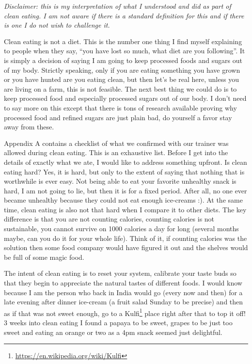 \documentclass[
  oneside]{book}
\DeclareRobustCommand{\href}[2]{#2\footnote{\url{#1}}}
\begin{document}
\emph{Disclaimer: this is my interpretation of what I understood and did as part of clean eating. I am not aware if there is a standard definition for this and if there is one I do not wish to challenge it.}

Clean eating is not a diet. This is the number one thing I find myself explaining to people when they say, ``you have lost so much, what diet are you following''. It is simply a decision of saying I am going to keep processed foods and sugars out of my body. Strictly speaking, only if you are eating something you have grown or you have hunted are you eating clean, but then let's be real here, unless you are living on a farm, this is not feasible. The next best thing we could do is to keep processed food and especially processed sugars out of our body. I don't need to say more on this except that there is tons of research available proving why processed food and refined sugars are just plain bad, do yourself a favor stay away from these.

Appendix A contains a checklist of what we confirmed with our trainer was allowed during clean eating. This is an exhaustive list. Before I get into the details of exactly what we ate, I would like to address something upfront. Is clean eating hard? Yes, it is hard, but only to the extent of saying that nothing that is worthwhile is ever easy. Not being able to eat your favorite unhealthy snack is hard, I am not going to lie, but then it is for a fixed period. After all, no one ever became unhealthy because they could not eat enough ice-creams :). At the same time, clean eating is also not that hard when I compare it to other diets. The key difference is that you are not counting calories, counting calories is not sustainable, you cannot survive on 1000 calories a day for long (several months maybe, can you do it for your whole life). Think of it, if counting calories was the solution then some food company would have figured it out and the shelves would be full of some magic food.

The intent of clean eating is to reset your system, calibrate your taste buds so that they begin to appreciate the natural tastes of different foods. I would know because I am the person who back in India would go (every now and then) for a late evening after dinner ice-cream (a fruit salad Sunday to be precise) and then as if that was not sweet enough, go to a \href{https://en.wikipedia.org/wiki/Kulfi}{Kulfi} place right after that to top it off! 3 weeks into clean eating I found a papaya to be sweet, grapes to be just too sweet and eating an orange or two as a 4pm snack seemed just delightful.
\end{document}
